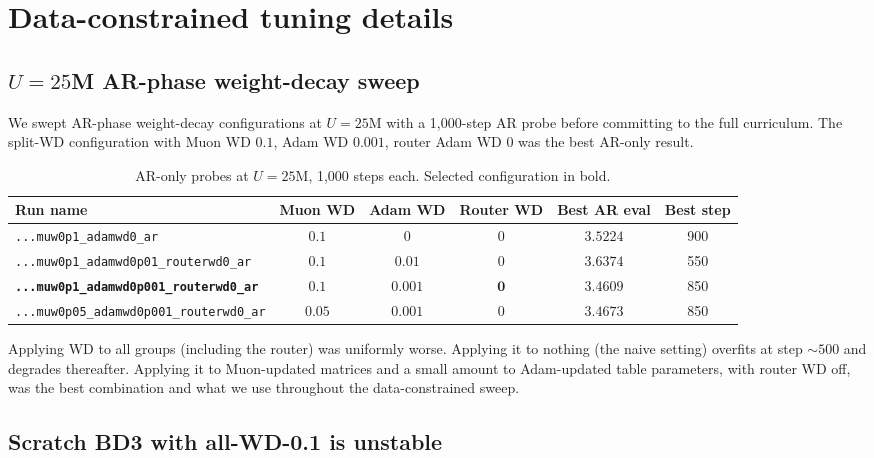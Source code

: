 \documentclass{article}
\begin{document}
\section{Data-constrained tuning details}
\label{app:dc_tuning}

\subsection{$U{=}25$M AR-phase weight-decay sweep}

We swept AR-phase weight-decay configurations at $U{=}25$M with a 1{,}000-step AR probe before committing to the full curriculum. The split-WD configuration with Muon WD $0.1$, Adam WD $0.001$, router Adam WD $0$ was the best AR-only result.

\begin{table}[h]
\centering
\caption{AR-only probes at $U{=}25$M, 1{,}000 steps each. Selected configuration in bold.}
\small
\begin{tabular}{lccccc}
\toprule
Run name & Muon WD & Adam WD & Router WD & Best AR eval & Best step \\
\midrule
\texttt{...muw0p1\_adamwd0\_ar}              & $0.1$  & $0$     & $0$ & $3.5224$ & 900 \\
\texttt{...muw0p1\_adamwd0p01\_routerwd0\_ar} & $0.1$  & $0.01$  & $0$ & $3.6374$ & 550 \\
\textbf{\texttt{...muw0p1\_adamwd0p001\_routerwd0\_ar}} & $\mathbf{0.1}$  & $\mathbf{0.001}$ & $\mathbf{0}$ & $\mathbf{3.4609}$ & 850 \\
\texttt{...muw0p05\_adamwd0p001\_routerwd0\_ar}        & $0.05$ & $0.001$ & $0$ & $3.4673$ & 850 \\
\bottomrule
\end{tabular}
\end{table}

Applying WD to all groups (including the router) was uniformly worse. Applying it to nothing (the naive setting) overfits at step ${\sim}500$ and degrades thereafter. Applying it to Muon-updated matrices and a small amount to Adam-updated table parameters, with router WD off, was the best combination and what we use throughout the data-constrained sweep.

\subsection{Scratch BD3 with all-WD-0.1 is unstable}
\end{document}

